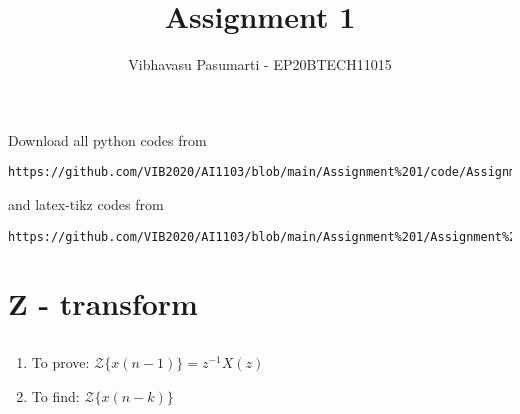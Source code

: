 \documentclass[journal,12pt,twocolumn]{IEEEtran}
\theoremstyle{remark}
\numberwithin{equation}{section}
\renewcommand{\thefigure}{\theproblem}
\begin{document}
\title{Assignment 1}
\author{Vibhavasu Pasumarti - EP20BTECH11015}
\maketitle
\newpage
\bigskip
\renewcommand{\thefigure}{\theenumi}
\renewcommand{\thetable}{\theenumi}
Download all python codes from 
\begin{lstlisting}
https://github.com/VIB2020/AI1103/blob/main/Assignment%201/code/Assignment_1.py
\end{lstlisting}
%
and latex-tikz codes from 
%
\begin{lstlisting}
https://github.com/VIB2020/AI1103/blob/main/Assignment%201/Assignment%201.tex
\end{lstlisting}

\section{}
\section{}
\section{}
\section{Z - transform}
\subsection{}
\begin{enumerate}[label=\roman*)]
    \item  To prove:    ${\mathcal {Z}}\{x(n-1)\} = z^{-1}X(z)$\\

    \item To find:  ${\mathcal {Z}}\{x(n-k)\}$
\end{enumerate}
\end{document}
